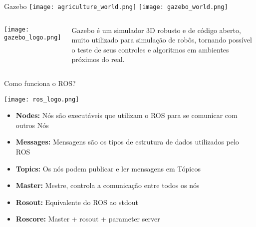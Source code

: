 \begin{frame}[t]{Gazebo} 
  \centering
  \texttt{[image: agriculture\_world.png]}
  \texttt{[image: gazebo\_world.png]}
  
  \begin{columns}
    \texttt{[image: gazebo\_logo.png]}

    
    Gazebo é um simulador 3D robusto e de código aberto, muito utilizado para simulação de robôs, tornando possível o teste de seus controles e algoritmos em ambientes próximos do real.
  \end{columns}

\end{frame}


\begin{frame}[t]{Como funciona o ROS?}

  \texttt{[image: ros\_logo.png]}
  \vspace{.5cm}
  \begin{itemize}
    \item \textbf{Nodes:} Nós são executáveis que utilizam o ROS para se comunicar com outros Nós
    \item \textbf{Messages:} Mensagens são os tipos de estrutura de dados utilizados pelo ROS
    \item \textbf{Topics:} Os nós podem publicar e ler mensagens em Tópicos
    \item \textbf{Master:} Mestre, controla a comunicação entre todos os nós
    \item \textbf{Rosout:} Equivalente do ROS ao stdout
    \item \textbf{Roscore:} Master + rosout + parameter server 
  \end{itemize}

\end{frame}
